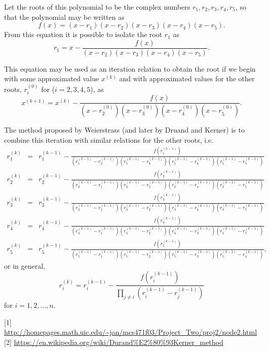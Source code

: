 \documentclass[11pt]{article}
\begin{document}
 Let the roots of this polynomial to be the complex numbers $r_1, r_2, r_3, r_4, r_5$, so that the polynomial may be written as
\begin{equation}
f(x) = (x - r_1)(x - r_2)(x - r_3)(x - r_4)(x - r_5).
\end{equation}
 From this equation it is possible to isolate the root $r_1$ as
 \begin{equation}
 r_1 = x - \frac{f(x)}{(x - r_2)(x - r_3)(x - r_4)(x - r_5)}.
 \end{equation}
 
This equation  may be used as an iteration relation to obtain the root if we begin with some approximated value $x^{(k)}$ and with approximated values for the other roots, $r_i^{(0)}$ for ($i=2,3,4,5$), as
 \begin{equation}
 x^{(k+1)} = x^{(k)} - \frac{f(x)}{(x - r_2^{(0)})(x - r_3^{(0)})(x - r_4^{(0)})(x - r_5^{(0)})}.
 \end{equation}
 
 The method proposed by Weierstrass (and later by Druand and Kerner) is to combine this iteration with similar relations for the other roots, i.e.
 \begin{eqnarray}
 r^{(k)}_1 &=& r^{(k-1)}_1 - \frac{f(r^{(k-1)}_1)}{(r^{(k-1)}_1 - r_2^{(k-1)})(r^{(k-1)}_1 - r_3^{(k-1)})(r^{(k-1)}_1 - r_4^{(k-1)})(r^{(k-1)}_1 - r_5^{(k-1)})}\\
 r^{(k)}_2 &=& r^{(k-1)}_2 - \frac{f(r^{(k-1)}_2)}{(r^{(k-1)}_2 - r_1^{(k-1)})(r^{(k-1)}_2 - r_3^{(k-1)})(r^{(k-1)}_2 - r_4^{(k-1)})(r^{(k-1)}_2 - r_5^{(k-1)})}\\
 r^{(k)}_3 &=& r^{(k-1)}_3 - \frac{f(r^{(k-1)}_3)}{(r^{(k-1)}_3 - r_1^{(k-1)})(r^{(k-1)}_3 - r_2^{(k-1)})(r^{(k-1)}_3 - r_4^{(k-1)})(r^{(k-1)}_3 - r_5^{(k-1)})}\\
 r^{(k)}_4 &=& r^{(k-1)}_4 - \frac{f(r^{(k-1)}_4)}{(r^{(k-1)}_4 - r_1^{(k-1)})(r^{(k-1)}_4 - r_2^{(k-1)})(r^{(k-1)}_4 - r_3^{(k-1)})(r^{(k-1)}_4 - r_5^{(k-1)})}\\
  r^{(k)}_5 &=& r^{(k-1)}_5 - \frac{f(r^{(k-1)}_5)}{(r^{(k-1)}_5 - r_1^{(k-1)})(r^{(k-1)}_5 - r_2^{(k-1)})(r^{(k-1)}_5 - r_3^{(k-1)})(r^{(k-1)}_5 - r_4^{(k-1)})},
 \end{eqnarray}
or in general,
\begin{equation}
r^{(k)}_i = r^{(k-1)}_i - \frac{f(r^{(k-1)}_i)}{\prod_{j \neq i} \left( r^{(k-1)}_i - r^{(k-1)}_j  \right)}
\end{equation}
for $i= 1,2,...,n$.

[1] \url{http://homepages.math.uic.edu/~jan/mcs471f03/Project_Two/proj2/node2.html}\\

[2] \url{https://en.wikipedia.org/wiki/Durand\%E2\%80\%93Kerner_method}
\end{document}
